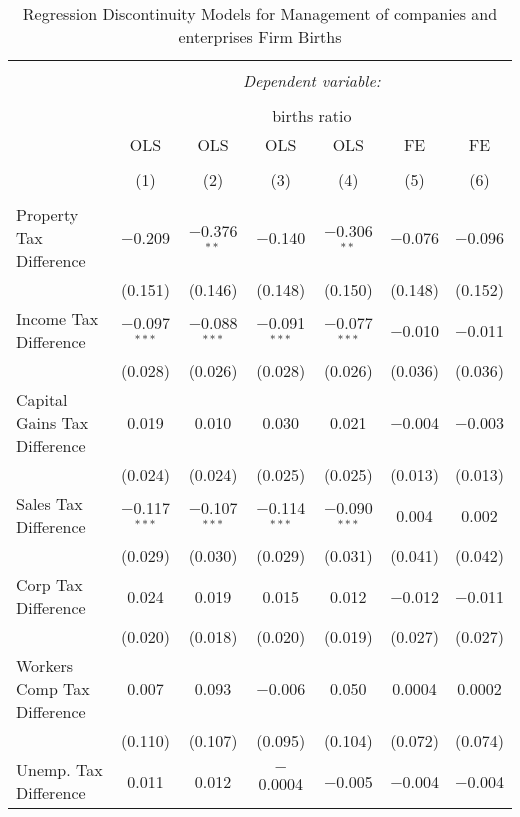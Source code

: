 
\begin{table}[!htbp] \centering 
  \caption{Regression Discontinuity Models for  Management of companies and enterprises Firm Births} 
  \label{55rd} 
\begin{tabular}{@{\extracolsep{5pt}}lcccccc} 
\\[-1.8ex]\hline 
\hline \\[-1.8ex] 
 & \multicolumn{6}{c}{\textit{Dependent variable:}} \\ 
\cline{2-7} 
\\[-1.8ex] & \multicolumn{6}{c}{births ratio} \\ 
 & OLS & OLS & OLS & OLS & FE & FE \\ 
\\[-1.8ex] & (1) & (2) & (3) & (4) & (5) & (6)\\ 
\hline \\[-1.8ex] 
 Property Tax Difference & $-$0.209 & $-$0.376$^{**}$ & $-$0.140 & $-$0.306$^{**}$ & $-$0.076 & $-$0.096 \\ 
  & (0.151) & (0.146) & (0.148) & (0.150) & (0.148) & (0.152) \\ 
  Income Tax Difference & $-$0.097$^{***}$ & $-$0.088$^{***}$ & $-$0.091$^{***}$ & $-$0.077$^{***}$ & $-$0.010 & $-$0.011 \\ 
  & (0.028) & (0.026) & (0.028) & (0.026) & (0.036) & (0.036) \\ 
  Capital Gains Tax Difference & 0.019 & 0.010 & 0.030 & 0.021 & $-$0.004 & $-$0.003 \\ 
  & (0.024) & (0.024) & (0.025) & (0.025) & (0.013) & (0.013) \\ 
  Sales Tax Difference & $-$0.117$^{***}$ & $-$0.107$^{***}$ & $-$0.114$^{***}$ & $-$0.090$^{***}$ & 0.004 & 0.002 \\ 
  & (0.029) & (0.030) & (0.029) & (0.031) & (0.041) & (0.042) \\ 
  Corp Tax Difference & 0.024 & 0.019 & 0.015 & 0.012 & $-$0.012 & $-$0.011 \\ 
  & (0.020) & (0.018) & (0.020) & (0.019) & (0.027) & (0.027) \\ 
  Workers Comp Tax Difference & 0.007 & 0.093 & $-$0.006 & 0.050 & 0.0004 & 0.0002 \\ 
  & (0.110) & (0.107) & (0.095) & (0.104) & (0.072) & (0.074) \\ 
  Unemp. Tax Difference & 0.011 & 0.012 & $-$0.0004 & $-$0.005 & $-$0.004 & $-$0.004 \\ 

\end{tabular}
\end{table}
